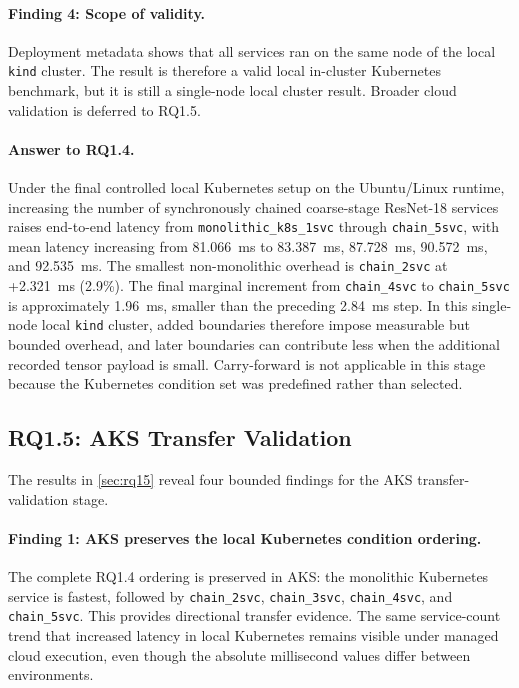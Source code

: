 \paragraph{Finding 4: Scope of validity.}
Deployment metadata shows that all services ran on the same node of the local
\texttt{kind} cluster. The result is therefore a valid local in-cluster
Kubernetes benchmark, but it is still a single-node local cluster result.
Broader cloud validation is deferred to RQ1.5.

\paragraph{Answer to RQ1.4.}
Under the final controlled local Kubernetes setup on the Ubuntu/Linux runtime,
increasing the number of synchronously chained coarse-stage ResNet-18 services
raises end-to-end latency from \texttt{monolithic\_k8s\_1svc} through
\texttt{chain\_5svc}, with mean latency increasing from 81.066~ms to
83.387~ms, 87.728~ms, 90.572~ms, and 92.535~ms. The smallest non-monolithic
overhead is \texttt{chain\_2svc} at +2.321~ms (2.9\%). The final marginal
increment from \texttt{chain\_4svc} to \texttt{chain\_5svc} is approximately
1.96~ms, smaller than the preceding 2.84~ms step. In this single-node local
\texttt{kind} cluster, added boundaries therefore impose measurable but
bounded overhead, and later boundaries can contribute less when the additional
recorded tensor payload is small. Carry-forward is not applicable in this stage
because the Kubernetes condition set was predefined rather than selected.

\subsection{RQ1.5: AKS Transfer Validation}
\label{sec:analysis-rq15}

The results in \cref{sec:rq15} reveal four bounded findings for the AKS
transfer-validation stage.

\paragraph{Finding 1: AKS preserves the local Kubernetes condition ordering.}
The complete RQ1.4 ordering is preserved in AKS: the monolithic Kubernetes
service is fastest, followed by \texttt{chain\_2svc}, \texttt{chain\_3svc},
\texttt{chain\_4svc}, and \texttt{chain\_5svc}. This provides directional
transfer evidence. The same service-count trend that increased latency in
local Kubernetes remains visible under managed cloud execution, even though
the absolute millisecond values differ between environments.

